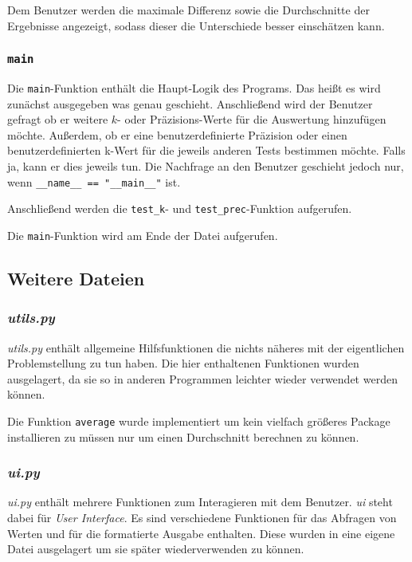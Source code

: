 \documentclass{article}
\begin{document}
		Dem Benutzer werden die maximale Differenz sowie die Durchschnitte der Ergebnisse angezeigt, sodass dieser die Unterschiede besser einschätzen kann.
		
	
	\subsubsection{\texttt{main}}
	
		Die \verb|main|-Funktion enthält die Haupt-Logik des Programs. Das heißt es wird zunächst ausgegeben was genau geschieht. Anschließend wird der Benutzer gefragt ob er weitere $k$- oder Präzisions-Werte für die Auswertung hinzufügen möchte. Außerdem, ob er eine benutzerdefinierte Präzision oder einen benutzerdefinierten k-Wert für die jeweils anderen Tests bestimmen möchte. Falls ja, kann er dies jeweils tun. Die Nachfrage an den Benutzer geschieht jedoch nur, wenn \verb|__name__ == "__main__"| ist. 
		
		Anschließend werden die \verb|test_k|- und \verb|test_prec|-Funktion aufgerufen.
		
		Die \verb|main|-Funktion wird am Ende der Datei aufgerufen.
	
	
	\subsection{Weitere Dateien}	
	
	\subsubsection{\emph{utils.py}}
	
		\emph{utils.py} enthält allgemeine Hilfsfunktionen die nichts näheres mit der eigentlichen Problemstellung zu tun haben. Die hier enthaltenen Funktionen wurden ausgelagert, da sie so in anderen Programmen leichter wieder verwendet werden können.
		
		Die Funktion \verb|average| wurde implementiert um kein vielfach größeres Package installieren zu müssen nur um einen Durchschnitt berechnen zu können.
	
	\subsubsection{\emph{ui.py}}
	
		\emph{ui.py} enthält mehrere Funktionen zum Interagieren mit dem Benutzer. \emph{ui} steht dabei für \emph{User Interface}. Es sind verschiedene Funktionen für das Abfragen von Werten und für die formatierte Ausgabe enthalten. Diese wurden in eine eigene Datei ausgelagert um sie später wiederverwenden zu können.
	
\end{document}
